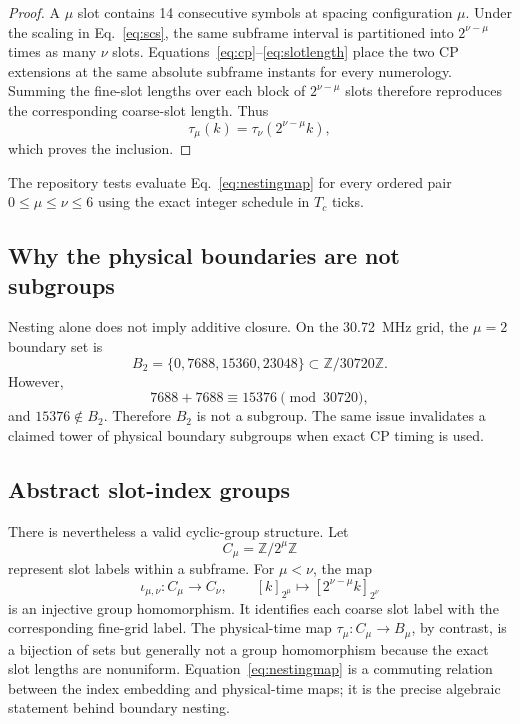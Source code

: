 \documentclass[11pt]{article}
\begin{document}
\begin{proof}
A $\mu$ slot contains 14 consecutive symbols at spacing configuration $\mu$.  Under the scaling in Eq.~\eqref{eq:scs}, the same subframe interval is partitioned into $2^{\nu-\mu}$ times as many $\nu$ slots.  Equations~\eqref{eq:cp}--\eqref{eq:slotlength} place the two CP extensions at the same absolute subframe instants for every numerology.  Summing the fine-slot lengths over each block of $2^{\nu-\mu}$ slots therefore reproduces the corresponding coarse-slot length.  Thus
\begin{equation}
    \tau_\mu(k)=\tau_\nu\!\left(2^{\nu-\mu}k\right),
    \label{eq:nestingmap}
\end{equation}
which proves the inclusion.
\end{proof}

The repository tests evaluate Eq.~\eqref{eq:nestingmap} for every ordered pair $0\leq\mu\leq\nu\leq6$ using the exact integer schedule in $T_c$ ticks.

\subsection{Why the physical boundaries are not subgroups}

Nesting alone does not imply additive closure.  On the 30.72~MHz grid, the $\mu=2$ boundary set is
\begin{equation}
    B_2=\{0,7688,15360,23048\}\subset\mathbb{Z}/30720\mathbb{Z}.
\end{equation}
However,
\begin{equation}
    7688+7688\equiv15376\pmod{30720},
\end{equation}
and $15376\notin B_2$.  Therefore $B_2$ is not a subgroup.  The same issue invalidates a claimed tower of physical boundary subgroups when exact CP timing is used.

\subsection{Abstract slot-index groups}

There is nevertheless a valid cyclic-group structure.  Let
\begin{equation}
    C_\mu=\mathbb{Z}/2^\mu\mathbb{Z}
\end{equation}
represent slot labels within a subframe.  For $\mu<\nu$, the map
\begin{equation}
    \iota_{\mu,\nu}:C_\mu\longrightarrow C_\nu,
    \qquad [k]_{2^\mu}\longmapsto[2^{\nu-\mu}k]_{2^\nu}
    \label{eq:embedding}
\end{equation}
is an injective group homomorphism.  It identifies each coarse slot label with the corresponding fine-grid label.  The physical-time map $\tau_\mu:C_\mu\to B_\mu$, by contrast, is a bijection of sets but generally not a group homomorphism because the exact slot lengths are nonuniform.  Equation~\eqref{eq:nestingmap} is a commuting relation between the index embedding and physical-time maps; it is the precise algebraic statement behind boundary nesting.
\end{document}

